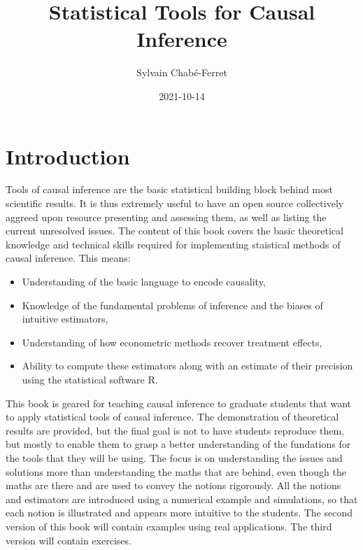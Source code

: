 \documentclass[
]{book}
\title{Statistical Tools for Causal Inference}
\author{Sylvain Chabé-Ferret}
\date{2021-10-14}
\providecommand{\tightlist}{%
  \setlength{\itemsep}{0pt}\setlength{\parskip}{0pt}}
\theoremstyle{definition}
\theoremstyle{definition}
\theoremstyle{definition}
\theoremstyle{definition}
\theoremstyle{remark}
\begin{document}
\maketitle

{
\setcounter{tocdepth}{0}
\tableofcontents
}
\hypertarget{introduction}{%
\chapter*{Introduction}\label{introduction}}

Tools of causal inference are the basic statistical building block behind most scientific results.
It is thus extremely useful to have an open source collectively aggreed upon resource presenting and assessing them, as well as listing the current unresolved issues.
The content of this book covers the basic theoretical knowledge and technical skills required for implementing staistical methods of causal inference.
This means:

\begin{itemize}
\tightlist
\item
  Understanding of the basic language to encode causality,
\item
  Knowledge of the fundamental problems of inference and the biases of intuitive estimators,
\item
  Understanding of how econometric methods recover treatment effects,
\item
  Ability to compute these estimators along with an estimate of their precision using the statistical software R.
\end{itemize}

This book is geared for teaching causal inference to graduate students that want to apply statistical tools of causal inference.
The demonstration of theoretical results are provided, but the final goal is not to have students reproduce them, but mostly to enable them to grasp a better understanding of the fundations for the tools that they will be using.
The focus is on understanding the issues and solutions more than understanding the maths that are behind, even though the maths are there and are used to convey the notions rigorously.
All the notions and estimators are introduced using a numerical example and simulations, so that each notion is illustrated and appears more intuitive to the students.
The second version of this book will contain examples using real applications.
The third version will contain exercises.
\end{document}
